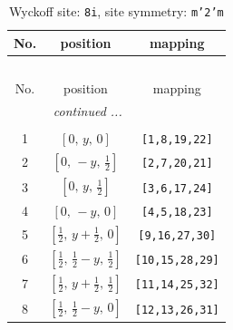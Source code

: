 \documentclass[fleqn,8pt]{jsarticle}
\begin{document}
\begin{longtable}{ccc}
\caption{Wyckoff site: {\tt 8i}, site symmetry: {\tt m'2'm}}
 \\
 \hline \hline
No. & position & mapping \\ \hline \endfirsthead

\multicolumn{2}{l}{\tablename\ \thetable{}} \\
 \hline \hline
No. & position & mapping \\ \hline \endhead

 \hline \hline
\multicolumn{2}{r}{\footnotesize\it continued ...} \\ \endfoot

 \hline \hline
\multicolumn{2}{r}{} \\ \endlastfoot

1 & $\left[ 0,\, y,\, 0 \right]$ & {\tt [1,8,19,22]} \\ \hline
2 & $\left[ 0,\, - y,\, \frac{1}{2} \right]$ & {\tt [2,7,20,21]} \\ \hline
3 & $\left[ 0,\, y,\, \frac{1}{2} \right]$ & {\tt [3,6,17,24]} \\ \hline
4 & $\left[ 0,\, - y,\, 0 \right]$ & {\tt [4,5,18,23]} \\ \hline
5 & $\left[ \frac{1}{2},\, y + \frac{1}{2},\, 0 \right]$ & {\tt [9,16,27,30]} \\ \hline
6 & $\left[ \frac{1}{2},\, \frac{1}{2} - y,\, \frac{1}{2} \right]$ & {\tt [10,15,28,29]} \\ \hline
7 & $\left[ \frac{1}{2},\, y + \frac{1}{2},\, \frac{1}{2} \right]$ & {\tt [11,14,25,32]} \\ \hline
8 & $\left[ \frac{1}{2},\, \frac{1}{2} - y,\, 0 \right]$ & {\tt [12,13,26,31]} \\
\end{longtable}
\renewcommand{\arraystretch}{1.2}
\end{document}
